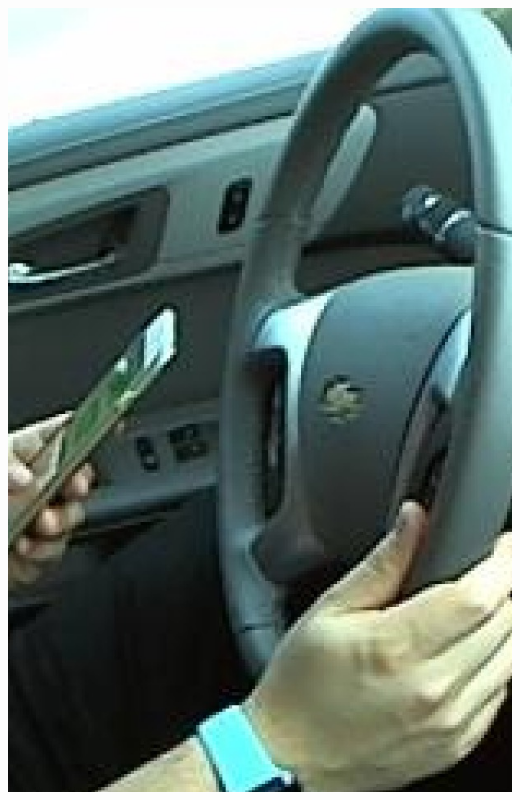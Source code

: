 \documentclass{beamer}
\begin{document}
\begin{frame}
\begin{columns}
\begin{column}{0.5\textwidth}
\begin{center}
					\includegraphics[height=0.5\textheight]{handpose_example_2_cut}\\			
				\end{center}
			\end{column}
		\end{columns}		
	\end{frame}
	
\end{document}
